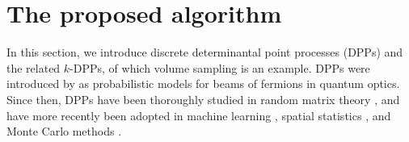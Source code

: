 \documentclass[twoside,11pt]{book}
\newcommand{\rev}[1]{\textcolor{darkgreen}{#1}}
\numberwithin{theorem}{chapter}
\numberwithin{definition}{chapter}
\numberwithin{proposition}{chapter}
\numberwithin{corollary}{chapter}
\numberwithin{example}{chapter}
\numberwithin{lemma}{chapter}
\numberwithin{assumption}{chapter}
\begin{document}

\section{The proposed algorithm}






In this section, we introduce discrete determinantal point processes (DPPs) and the related $k$-DPPs, of which volume sampling is an example. DPPs were introduced by \cite{Mac75} as probabilistic models for beams of fermions in quantum optics. Since then, DPPs have been thoroughly studied in random matrix theory \citep{Joh05}, and have more recently been adopted in machine learning \citep*{KuTa12}, spatial statistics \citep*{LaMoRu15}, and Monte Carlo methods \citep{BaHa16}.
\end{document}
